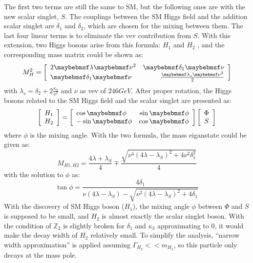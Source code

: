The first two terms are still the same to SM, but the following ones are with the new scalar singlet, $S$.  The couplings between the SM Higgs field and the addition scalar singlet are $\delta_1$ and $\delta_2$, which are chosen for the mixing between them. The last four linear terms is to eliminate the vev contribution from $S$. With this extension, two Higgs bosons arise from this formula: $H_1$ and $H_2$
, and the corresponding mass matrix could be shown as:
\begin{equation}
M_{H}^2 = \left[ \begin{array}{l r} 2\lambda \nu^2 &  \delta_1 \nu \\ \delta_1 \nu& \frac{\lambda_{s}\nu^2}{2} \end{array} \right]
\end{equation}
with $\lambda_s = \delta_2+2\frac{\kappa_2}{\nu^2}$ and $\nu$ as vev of $246GeV$. After proper rotation, the Higgs bosons related to the SM Higgs field and the scalar singlet are presented as:
\begin{equation}
 \left[ \begin{array}{c} H_{1} \\ H_{2} \end{array} \right] = \left[ \begin{array}{l r} \cos{\phi} & \sin{\phi} \\ -\sin{\phi}& \cos{\phi} \end{array} \right] \left[ \begin{array}{c} \Phi \\ S \end{array} \right]
\end{equation}
where $\phi$ is the mixing angle. With the two formula, the mass eiganstate could be given as:
\begin{equation}
M_{H1,H2} = \frac{4\lambda+\lambda_{S}}{4}\mp\frac{\sqrt{\nu^4(4\lambda-\lambda_{S})^2+4\nu^2\delta_1^2}}{4}
\end{equation}
with the solution to $\phi$ as:
\begin{equation}
\tan{\phi} = \frac{4\delta_1}{\nu(4\lambda-\lambda_{S})-\sqrt{\nu^2(4\lambda-\lambda_{S})^2+4\delta_1}}
\end{equation}
With the discovery of SM Higgs boson ($H_{1}$), the mixing angle $\phi$ between $\Phi$ and $S$ is supposed to be small, and $H_2$ is almost exactly the scalar singlet boson. With the condition of $\mathbb{Z}_2$ is slightly broken for $\delta_1$ and $\kappa_3$ approximating to 0, it would make the decay width of $H_2$ relatively small. To simplify the analysis, ``narrow width approximation'' is applied assuming $\Gamma_{H_2}<<m_{H_2}$, so this particle only decays at the mass pole.
